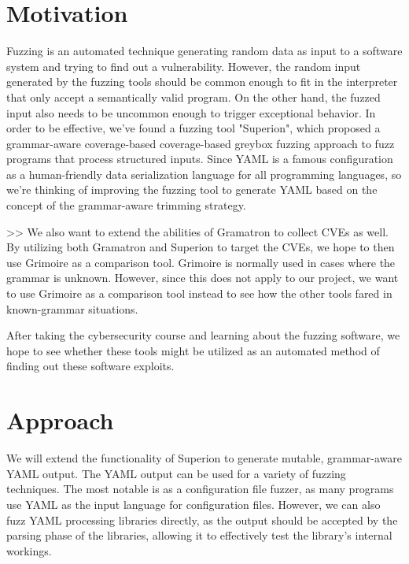 \documentclass[12pt]{diazessay}
\begin{document}

\section*{Motivation}

Fuzzing is an automated technique generating random data as input to a software system and trying to find out a vulnerability.
However, the random input generated by the fuzzing tools should be common enough to fit in the interpreter that only accept a semantically valid program. On the other hand, the fuzzed input also needs to be uncommon enough to trigger exceptional behavior.
In order to be effective, we've found a fuzzing tool "Superion"\cite{superion}, which proposed a grammar-aware coverage-based coverage-based greybox fuzzing approach to fuzz programs that process structured inputs.
Since YAML is a famous configuration as a human-friendly data serialization language for all programming languages, so we're thinking of improving the fuzzing tool to generate YAML based on the concept of the grammar-aware trimming strategy.

>> We also want to extend the abilities of Gramatron to collect CVEs as well. By utilizing both Gramatron and Superion to target the CVEs, we hope to then use Grimoire as a comparison tool. Grimoire is normally used in cases where the grammar is unknown. However, since this does not apply to our project, we want to use Grimoire as a comparison tool instead to see how the other tools fared in known-grammar situations. 

After taking the cybersecurity course and learning about the fuzzing software, we hope to see whether these tools might be utilized as an automated method of finding out these software exploits.



\section*{Approach}

We will extend the functionality of Superion to generate mutable, grammar-aware YAML output.
The YAML output can be used for a variety of fuzzing techniques.
The most notable is as a configuration file fuzzer, as many programs use YAML as the input language for configuration files.
However, we can also fuzz YAML processing libraries\cite{libfYAML}\cite{libYAML}\cite{YAMLcpp}\cite{rapidYAML}\cite{miniYAML} directly, as the output should be accepted by the parsing phase of the libraries, allowing it to effectively test the library's internal workings.
\end{document}
